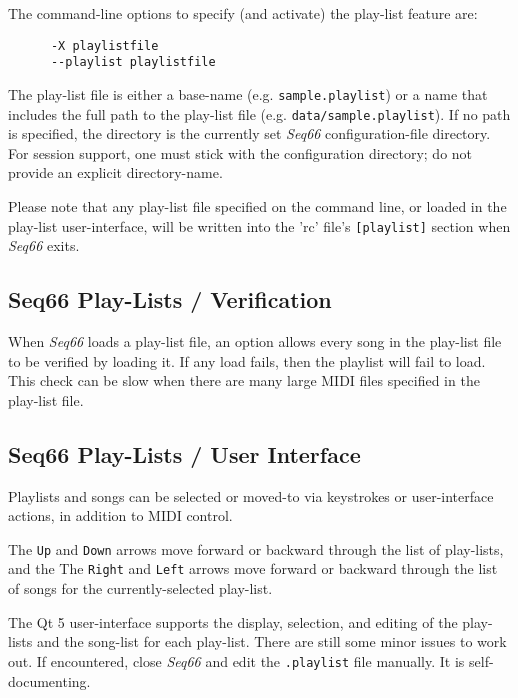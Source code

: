    The command-line options to specify (and activate) the play-list feature
   are:

   \begin{verbatim}
      -X playlistfile
      --playlist playlistfile
   \end{verbatim}

   The play-list file is either a base-name (e.g. \texttt{sample.playlist})
   or a name that includes the full path to the play-list file
   (e.g. \texttt{data/sample.playlist}).
   If no path is specified, the directory is the currently set
   \textsl{Seq66} configuration-file directory.
   For session support, one must stick with the configuration directory;
   do not provide an explicit directory-name.

   Please note that any play-list file specified on the command line, or loaded
   in the play-list user-interface,
   will be written into the 'rc' file's \texttt{[playlist]} section when
   \textsl{Seq66} exits.

\subsection{Seq66 Play-Lists / Verification}
\label{subsec:playlist_verify}

   When \textsl{Seq66} loads a play-list file, an option allows every
   song in the play-list file to be verified by loading it.  If any load fails,
   then the playlist will fail to load.  This check can be slow when there are
   many large MIDI files specified in the play-list file.

\subsection{Seq66 Play-Lists / User Interface}
\label{subsec:playlist_uis}

   Playlists and songs can be selected or moved-to via keystrokes or
   user-interface actions, in addition to MIDI control.

   The \texttt{Up} and \texttt{Down} arrows move forward or backward through
   the list of play-lists, and the
   The \texttt{Right} and \texttt{Left} arrows move forward or backward through
   the list of songs for the currently-selected play-list.

   The Qt 5 user-interface supports the display, selection, and editing of
   the play-lists and the song-list for each play-list.
   There are still some minor issues to work out.  If encountered, close
   \textsl{Seq66} and edit the \texttt{.playlist} file manually.
   It is self-documenting.

